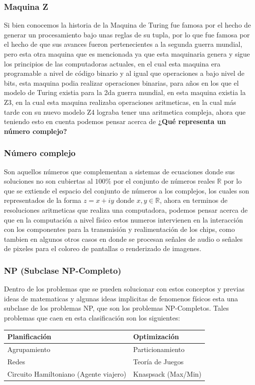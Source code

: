 \documentclass[10pt,executivepaper]{article}
\begin{document}
\subsubsection{Maquina Z}
Si bien conocemos la historia de la Maquina de Turing fue famosa por el hecho de generar un procesamiento bajo unas reglas de su tupla, por lo que fue famosa por el hecho de que sus avances fueron pertenecientes a la segunda guerra mundial, pero esta otra maquina que es mencionada ya que esta maquinaria genera y sigue los principios de las computadoras actuales, en el cual esta maquina era programable a nivel de código binario y al igual que operaciones a bajo nivel de bits, esta maquina podia realizar operaciones binarias, para años en los que el modelo de Turing existia para la 2{\tiny da} guerra mundial, en esta maquina existia la Z{\tiny 3}, en la cual esta maquina realizaba operaciones aritmeticas, en la cual más tarde con su nuevo modelo Z{\tiny 4} lograba tener una aritmetica compleja, ahora que teniendo esto en cuenta podemos pensar acerca de \textbf{¿Qué representa un número complejo?}
\subsubsection{Número complejo}
Son aquellos números que complementan a sistemas de ecuaciones donde sus soluciones no son cubiertas al $100\%$ por el conjunto de números reales $\mathbb{R}$ por lo que se extiende el espacio del conjunto de números a los complejos, los cuales son representados de la forma $z=x+iy$ donde $x,y \in\mathbb{R}$, ahora en terminos de resoluciones aritmeticas que realiza una computadora, podemos pensar acerca de que en la computación a nivel físico estos numeros intervienen en la interacción con los componentes para la transmisión y realimentación de los chips, como tambien en algunos otros casos en donde se procesan señales de audio o señales de pixeles para el coloreo de pantallas o renderizado de imagenes.
\subsubsection{NP (Subclase NP-Completo)}

Dentro de los problemas que se pueden solucionar con estos conceptos y previas ideas de matematicas y algunas ideas implicitas de fenomenos físicos esta una subclase de los problemas NP, que son los problemas NP-Completos. Tales problemas que caen en esta clasificación son los siguientes:
\begin{center}
  \begin{tabular}{|p{5.5cm}|p{5.5cm}|}
    \hline
    Planificación & Optimización\\
    \hline
    Agrupamiento & Particionamiento\\
    \hline
    Redes & Teoría de Juegos\\
    \hline
    Circuito Hamiltoniano (Agente viajero) & Knaspsack (Max/Min)\\
    \hline
  \end{tabular}
\end{center}

\printindex
\end{document}
